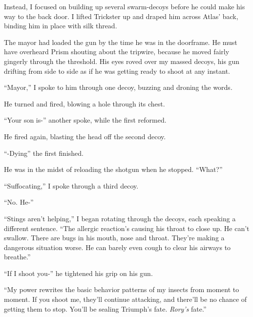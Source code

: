 Instead, I focused on building up several swarm-decoys before he could make his way to the back door.  I lifted Trickster up and draped him across Atlas' back, binding him in place with silk thread.



The mayor had loaded the gun by the time he was in the doorframe.  He must have overheard Prism shouting about the tripwire, because he moved fairly gingerly through the threshold.  His eyes roved over my massed decoys, his gun drifting from side to side as if he was getting ready to shoot at any instant.



``Mayor,'' I spoke to him through one decoy, buzzing and droning the words.



He turned and fired, blowing a hole through its chest.



``Your son is-'' another spoke, while the first reformed.



He fired again, blasting the head off the second decoy.



``-Dying'' the first finished.



He was in the midst of reloading the shotgun when he stopped.  ``What?''



``Suffocating,'' I spoke through a third decoy.



``No.  He-''



``Stings aren't helping,'' I began rotating through the decoys, each speaking a different sentence.  ``The allergic reaction's causing his throat to close up.  He can't swallow.  There are bugs in his mouth, nose and throat.  They're making a dangerous situation worse.  He can barely even cough to clear his airways to breathe.''



``If I shoot you-'' he tightened his grip on his gun.



``My power rewrites the basic behavior patterns of my insects from moment to moment.  If you shoot me, they'll continue attacking, and there'll be no chance of getting them to stop.  You'll be sealing Triumph's fate.  \emph{Rory's }fate.''



